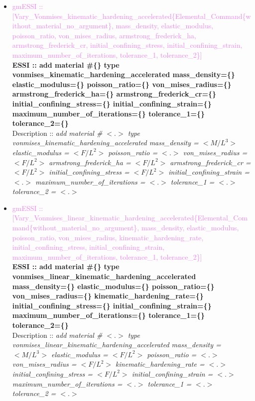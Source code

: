 \documentclass[11pt]{article}
\begin{document}
\begin{itemize}
    \item \textcolor{violet}{gmESSI :: [Vary\_Vonmises\_kinematic\_hardening\_accelerated\{Elemental\_Command\{without\_material\_no\_argument\}, mass\_density, elastic\_modulus, poisson\_ratio, von\_mises\_radius, armstrong\_frederick\_ha, armstrong\_frederick\_cr, initial\_confining\_stress, initial\_confining\_strain, maximum\_number\_of\_iterations, tolerance\_1, tolerance\_2\}]}\\
    \textbf{ESSI :: add material \#\{\} type vonmises\_kinematic\_hardening\_accelerated mass\_density=\{\} elastic\_modulus=\{\} poisson\_ratio=\{\} von\_mises\_radius=\{\} armstrong\_frederick\_ha=\{\} armstrong\_frederick\_cr=\{\} initial\_confining\_stress=\{\} initial\_confining\_strain=\{\} maximum\_number\_of\_iterations=\{\} tolerance\_1=\{\} tolerance\_2=\{\}}\\
    Description ::  \textit{ add material \# $<.>$ type vonmises\_kinematic\_hardening\_accelerated mass\_density = $<M/L^3>$ elastic\_modulus = $<F/L^2>$ poisson\_ratio = $<.>$ von\_mises\_radius = $<F/L^2>$ armstrong\_frederick\_ha = $<F/L^2>$ armstrong\_frederick\_cr = $<F/L^2>$ initial\_confining\_stress = $<F/L^2>$ initial\_confining\_strain = $<.>$ maximum\_number\_of\_iterations = $<.>$ tolerance\_1 = $<.>$ tolerance\_2 = $<.>$} 

    \item \textcolor{violet}{gmESSI :: [Vary\_Vonmises\_linear\_kinematic\_hardening\_accelerated\{Elemental\_Command\{without\_material\_no\_argument\}, mass\_density, elastic\_modulus, poisson\_ratio, von\_mises\_radius, kinematic\_hardening\_rate, initial\_confining\_stress, initial\_confining\_strain, maximum\_number\_of\_iterations, tolerance\_1, tolerance\_2\}]}\\
    \textbf{ESSI :: add material \#\{\} type vonmises\_linear\_kinematic\_hardening\_accelerated mass\_density=\{\} elastic\_modulus=\{\} poisson\_ratio=\{\} von\_mises\_radius=\{\} kinematic\_hardening\_rate=\{\} initial\_confining\_stress=\{\} initial\_confining\_strain=\{\} maximum\_number\_of\_iterations=\{\} tolerance\_1=\{\} tolerance\_2=\{\}}\\
    Description ::  \textit{ add material \# $<.>$ type vonmises\_linear\_kinematic\_hardening\_accelerated mass\_density = $<M/L^3>$ elastic\_modulus = $<F/L^2>$ poisson\_ratio = $<.>$ von\_mises\_radius = $<F/L^2>$ kinematic\_hardening\_rate = $<.>$ initial\_confining\_stress = $<F/L^2>$ initial\_confining\_strain = $<.>$ maximum\_number\_of\_iterations = $<.>$ tolerance\_1 = $<.>$ tolerance\_2 = $<.>$} 


\end{itemize}
\end{document}
